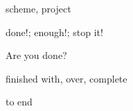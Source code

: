 \cardfrontfoot{}
\begin{flashcard}{\LARGE scheme, project}
\LARGE {}
\end{flashcard}
\cardfrontfoot{}
\begin{flashcard}{\LARGE done!; enough!; stop it!}
\LARGE {}
\end{flashcard}
\cardfrontfoot{}
\begin{flashcard}{\LARGE Are you done?}
\LARGE {}
\end{flashcard}
\cardfrontfoot{}
\begin{flashcard}{\LARGE finished with, over, complete}
\LARGE {}
\end{flashcard}
\cardfrontfoot{}
\begin{flashcard}{\LARGE to end}
\LARGE {}
\end{flashcard}


